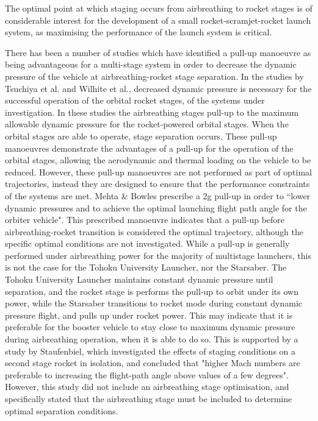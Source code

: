 The optimal point at which staging occurs from airbreathing to rocket stages is of considerable interest for the development of a small rocket-scramjet-rocket launch system, as maximising the performance of the launch system is critical. 



There has been a number of studies which have identified a pull-up manoeuvre as being advantageous for a multi-stage system in order to decrease the dynamic pressure of the vehicle at airbreathing-rocket stage separation\cite{Tsuchiya2005,Wilhite1991,Mehta2001}. 
In the studies by Tsuchiya et al.\cite{Tsuchiya2005} and Wilhite et al.\cite{Wilhite1991}, decreased dynamic pressure is necessary for the successful operation of the orbital rocket stages, of the systems under investigation. In these studies the airbreathing stages pull-up to the maximum allowable dynamic pressure for the rocket-powered orbital stages. When the orbital stages are able to operate, stage separation occurs. These pull-up manoeuvres demonstrate the advantages of a pull-up for the operation of the orbital stages, allowing the aerodynamic and thermal loading on the vehicle to be reduced. However, these pull-up manoeuvres are not performed as part of optimal trajectories, instead they are designed to ensure that the performance constraints of the systems are met. 
Mehta \& Bowles\cite{Mehta2001} prescribe a 2g pull-up in order to ``lower dynamic pressures and to achieve the optimal launching flight path angle for the orbiter vehicle". This prescribed manoeuvre indicates that a pull-up before airbreathing-rocket transition is considered the optimal trajectory, although the specific optimal conditions are not investigated. 
While a pull-up is generally performed under airbreathing power for the majority of multistage launchers, this is not the case for the Tohoku University Launcher, nor the Starsaber. The Tohoku University Launcher maintains constant dynamic pressure until separation, and the rocket stage is performs the pull-up to orbit under its own power, while the Starsaber transitions to rocket mode during constant dynamic pressure flight, and pulls up under rocket power. This may indicate that it is preferable for the booster vehicle to stay close to maximum dynamic pressure during airbreathing operation, when it is able to do so. This is supported by a study by Staufenbiel\cite{Staufenbiel2000}, which investigated the effects of staging conditions on a second stage rocket in isolation, and concluded that "higher Mach numbers are preferable to increasing the flight-path angle above values of a few degrees". However, this study did not include an airbreathing stage optimisation, and specifically stated that the airbreathing stage must be included to determine optimal separation conditions\cite{Staufenbiel2000}. 




